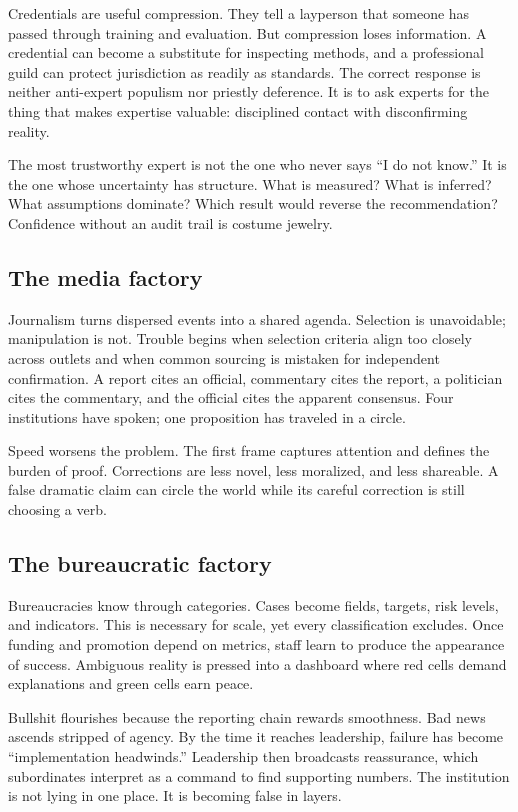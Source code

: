 ﻿\documentclass[12pt,a4paper]{book}
\begin{document}
Credentials are useful compression. They tell a layperson that someone has passed through training and evaluation. But compression loses information. A credential can become a substitute for inspecting methods, and a professional guild can protect jurisdiction as readily as standards. The correct response is neither anti-expert populism nor priestly deference. It is to ask experts for the thing that makes expertise valuable: disciplined contact with disconfirming reality.

The most trustworthy expert is not the one who never says “I do not know.” It is the one whose uncertainty has structure. What is measured? What is inferred? What assumptions dominate? Which result would reverse the recommendation? Confidence without an audit trail is costume jewelry.

\subsection{The media factory}

Journalism turns dispersed events into a shared agenda. Selection is unavoidable; manipulation is not. Trouble begins when selection criteria align too closely across outlets and when common sourcing is mistaken for independent confirmation. A report cites an official, commentary cites the report, a politician cites the commentary, and the official cites the apparent consensus. Four institutions have spoken; one proposition has traveled in a circle.

Speed worsens the problem. The first frame captures attention and defines the burden of proof. Corrections are less novel, less moralized, and less shareable. A false dramatic claim can circle the world while its careful correction is still choosing a verb.

\subsection{The bureaucratic factory}

Bureaucracies know through categories. Cases become fields, targets, risk levels, and indicators. This is necessary for scale, yet every classification excludes. Once funding and promotion depend on metrics, staff learn to produce the appearance of success. Ambiguous reality is pressed into a dashboard where red cells demand explanations and green cells earn peace.

Bullshit flourishes because the reporting chain rewards smoothness. Bad news ascends stripped of agency. By the time it reaches leadership, failure has become “implementation headwinds.” Leadership then broadcasts reassurance, which subordinates interpret as a command to find supporting numbers. The institution is not lying in one place. It is becoming false in layers.
\end{document}
